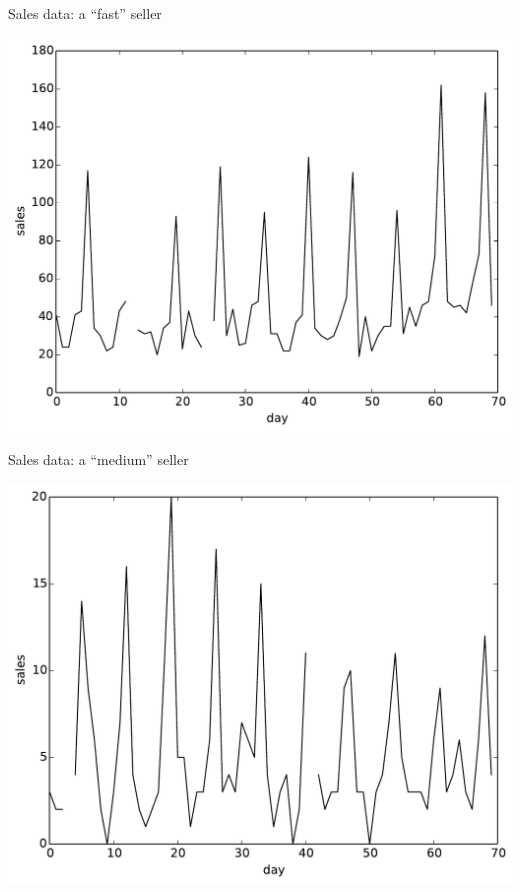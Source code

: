 \documentclass{beamer}
\begin{document}
\begin{frame}{Sales data: a ``fast'' seller}
 \begin{center}
  \includegraphics[width=0.8\columnwidth]{fast_seller.pdf}
 \end{center}
\end{frame}

\begin{frame}{Sales data: a ``medium'' seller}
 \begin{center}
  \includegraphics[width=0.8\columnwidth]{medium_seller.pdf}
 \end{center}
\end{frame}
\end{document}
